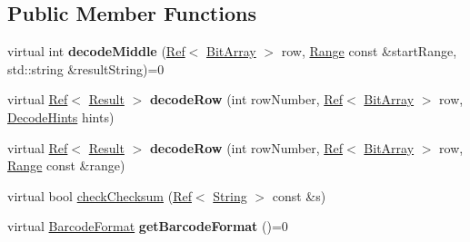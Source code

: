 \subsection*{Public Member Functions}
\begin{DoxyCompactItemize}
\item 
\mbox{\label{classzxing_1_1oned_1_1_u_p_c_e_a_n_reader_a326c40ae490988ec73443d04dd22da58}} 
virtual int {\bfseries decode\+Middle} (\mbox{\hyperlink{classzxing_1_1_ref}{Ref}}$<$ \mbox{\hyperlink{classzxing_1_1_bit_array}{Bit\+Array}} $>$ row, \mbox{\hyperlink{structzxing_1_1oned_1_1_one_d_reader_1_1_range}{Range}} const \&start\+Range, std\+::string \&result\+String)=0
\item 
\mbox{\label{classzxing_1_1oned_1_1_u_p_c_e_a_n_reader_a62dbb4c43f45c59c4dfb765376ed5ca2}} 
virtual \mbox{\hyperlink{classzxing_1_1_ref}{Ref}}$<$ \mbox{\hyperlink{classzxing_1_1_result}{Result}} $>$ {\bfseries decode\+Row} (int row\+Number, \mbox{\hyperlink{classzxing_1_1_ref}{Ref}}$<$ \mbox{\hyperlink{classzxing_1_1_bit_array}{Bit\+Array}} $>$ row, \mbox{\hyperlink{classzxing_1_1_decode_hints}{Decode\+Hints}} hints)
\item 
\mbox{\label{classzxing_1_1oned_1_1_u_p_c_e_a_n_reader_ace5eb0487a49723ddddb280af979e6ed}} 
virtual \mbox{\hyperlink{classzxing_1_1_ref}{Ref}}$<$ \mbox{\hyperlink{classzxing_1_1_result}{Result}} $>$ {\bfseries decode\+Row} (int row\+Number, \mbox{\hyperlink{classzxing_1_1_ref}{Ref}}$<$ \mbox{\hyperlink{classzxing_1_1_bit_array}{Bit\+Array}} $>$ row, \mbox{\hyperlink{structzxing_1_1oned_1_1_one_d_reader_1_1_range}{Range}} const \&range)
\item 
virtual bool \mbox{\hyperlink{classzxing_1_1oned_1_1_u_p_c_e_a_n_reader_a8dab230e3a380491ddd88447bb583d80}{check\+Checksum}} (\mbox{\hyperlink{classzxing_1_1_ref}{Ref}}$<$ \mbox{\hyperlink{classzxing_1_1_string}{String}} $>$ const \&s)
\item 
\mbox{\label{classzxing_1_1oned_1_1_u_p_c_e_a_n_reader_a2d0bf393b0dab5aeea9ad9b20586a5dd}} 
virtual \mbox{\hyperlink{classzxing_1_1_barcode_format}{Barcode\+Format}} {\bfseries get\+Barcode\+Format} ()=0
\end{DoxyCompactItemize}
